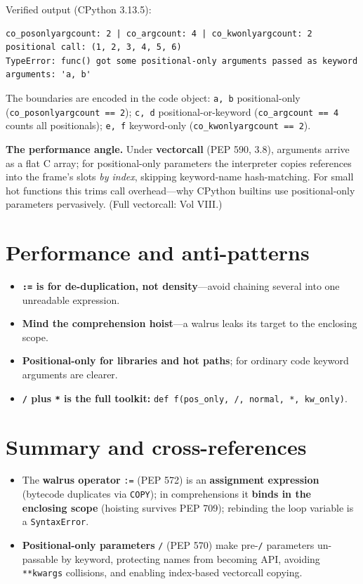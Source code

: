 Verified output (CPython 3.13.5):

\begin{lstlisting}[caption={Output}]
co_posonlyargcount: 2 | co_argcount: 4 | co_kwonlyargcount: 2
positional call: (1, 2, 3, 4, 5, 6)
TypeError: func() got some positional-only arguments passed as keyword arguments: 'a, b'
\end{lstlisting}

The boundaries are encoded in the code object: \texttt{a, b} positional-only
(\texttt{co\_posonlyargcount == 2}); \texttt{c, d} positional-or-keyword (\texttt{co\_argcount ==
4} counts all positionals); \texttt{e, f} keyword-only (\texttt{co\_kwonlyargcount == 2}).

\textbf{The performance angle.} Under \textbf{vectorcall} (PEP 590, 3.8), arguments arrive as a flat
C array; for positional-only parameters the interpreter copies references into the frame's slots
\emph{by index}, skipping keyword-name hash-matching. For small hot functions this trims call
overhead---why CPython builtins use positional-only parameters pervasively. (Full vectorcall: Vol
VIII.)

\section{Performance and anti-patterns}

\begin{itemize}
  \item \textbf{\texttt{:=} is for de-duplication, not density}---avoid chaining several into one
    unreadable expression.
  \item \textbf{Mind the comprehension hoist}---a walrus leaks its target to the enclosing scope.
  \item \textbf{Positional-only for libraries and hot paths}; for ordinary code keyword arguments
    are clearer.
  \item \textbf{\texttt{/} plus \texttt{*} is the full toolkit:}
    \texttt{def f(pos\_only, /, normal, *, kw\_only)}.
\end{itemize}

\section{Summary and cross-references}

\begin{itemize}
  \item The \textbf{walrus operator} \texttt{:=} (PEP 572) is an \textbf{assignment expression}
    (bytecode duplicates via \texttt{COPY}); in comprehensions it \textbf{binds in the enclosing
    scope} (hoisting survives PEP 709); rebinding the loop variable is a \texttt{SyntaxError}.
  \item \textbf{Positional-only parameters} \texttt{/} (PEP 570) make pre-\texttt{/} parameters
    un-passable by keyword, protecting names from becoming API, avoiding \texttt{**kwargs}
    collisions, and enabling index-based vectorcall copying.
\end{itemize}

